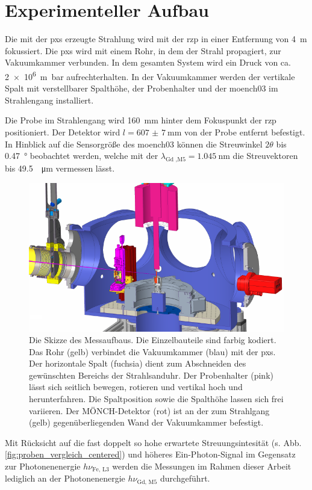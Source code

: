 \chapter{Experimenteller Aufbau}
Die mit der \gls{pxs} erzeugte Strahlung wird mit der \gls{rzp} in einer Entfernung von \SI{4}{\meter} fokussiert. Die \gls{pxs} wird mit einem Rohr, in dem der Strahl propagiert, zur Vakuumkammer verbunden. In dem gesamten System wird ein Druck von ca. \SI{2e6}{\meter\bar} aufrechterhalten. In der Vakuumkammer werden der vertikale Spalt mit verstellbarer Spalthöhe, der Probenhalter und der \gls{moench03} im Strahlengang installiert.

\noindent
Die Probe im Strahlengang wird \SI{160}{\milli\meter} hinter dem Fokuspunkt der \gls{rzp} positioniert. Der Detektor wird $l = \SI{607(7)}{\milli\meter}$ von der Probe entfernt befestigt. In Hinblick auf die Sensorgröße  des \gls{moench03} können die Streuwinkel $2\theta$ bis \SI{0.47}{\degree} beobachtet werden, welche mit der $\lambda_\text{Gd ,M5} = \SI{1.045}{\nano\meter}$ die Streuvektoren bis \SI{49,5}{\per\micro\meter} vermessen lässt.
\begin{figure}[H]
    \centering
    \includegraphics{images/aufbau/aufbau_empty.pdf}
    \caption{Die Skizze des Messaufbaus. Die Einzelbauteile sind farbig kodiert. Das Rohr (gelb) verbindet die Vakuumkammer (blau) mit der \gls{pxs}. Der horizontale Spalt (fuchsia) dient zum Abschneiden des gewünschten Bereichs der Strahlsanduhr. Der Probenhalter (pink) lässt sich seitlich bewegen, rotieren und vertikal hoch und herunterfahren. Die Spaltposition sowie die Spalthöhe lassen sich frei variieren. Der MÖNCH-Detektor (rot) ist an der zum Strahlgang (gelb) gegenüberliegenden Wand der Vakuumkammer befestigt.}
    \label{fig:anlage}
\end{figure}
\noindent
Mit Rücksicht auf die fast doppelt so hohe erwartete Streuungsintesität (s. Abb. \ref{fig:proben_vergleich_centered}) und höheres Ein-Photon-Signal im Gegensatz zur Photonenenergie $h\nu_\text{Fe, L3}$ werden die Messungen im Rahmen dieser Arbeit lediglich an der Photonenenergie $h\nu_\text{Gd, M5}$ durchgeführt.

